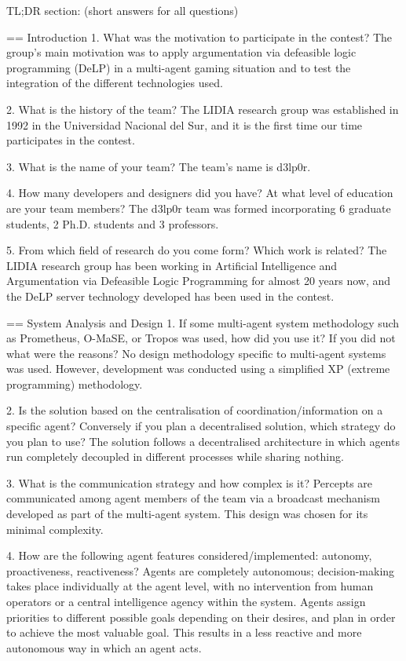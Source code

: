TL;DR section: (short answers for all questions)

== Introduction 1. What was the motivation to participate in the contest?  The
group's main motivation was to apply argumentation via defeasible logic
programming (DeLP) in a multi-agent gaming situation and to test the
integration of the different technologies used.

2. What is the history of the team?  The LIDIA research group was established
in 1992 in the Universidad Nacional del Sur, and it is the first time our time
participates in the contest.

3. What is the name of your team?  The team's name is d3lp0r.

4. How many developers and designers did you have?  At what level of education
are your team members?  The d3lp0r team was formed incorporating 6 graduate
students, 2 Ph.D. students and 3 professors.

5. From which field of research do you come form?  Which work is related?  The
LIDIA research group has been working in Artificial Intelligence and
Argumentation via Defeasible Logic Programming for almost 20 years now, and
the DeLP server technology developed has been used in the contest.

== System Analysis and Design 1. If some multi-agent system methodology such
as Prometheus, O-MaSE, or Tropos was used, how did you use it? If you did not
what were the reasons?  No design methodology specific to multi-agent systems
was used. However, development was conducted using a simplified XP (extreme
programming) methodology. 

2. Is the solution based on the centralisation of coordination/information on
a specific agent? Conversely if you plan a decentralised solution, which
strategy do you plan to use?  The solution follows a decentralised
architecture in which agents run completely decoupled in different processes
while sharing nothing.

3. What is the communication strategy and how complex is it?  Percepts are
communicated among agent members of the team via a broadcast mechanism
developed as part of the multi-agent system. This design was chosen for its
minimal complexity.

4. How are the following agent features considered/implemented: autonomy,
proactiveness, reactiveness?  Agents are completely autonomous;
decision-making takes place individually at the agent level, with no
intervention from human operators or a central intelligence agency within the
system.  Agents assign priorities to different possible goals depending on
their desires, and plan in order to achieve the most valuable goal. This
results in a less reactive and more autonomous way in which an agent acts.


